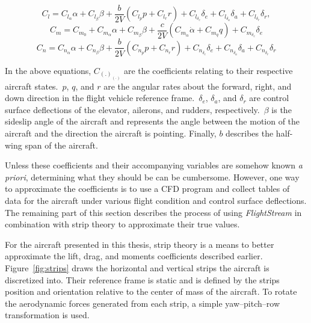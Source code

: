 \begin{equation}\label{eq:rollingmomentcoefficient}
    C_l = C_{l_\alpha}\alpha + C_{l_\beta}\beta + \frac{b}{2V}\left(C_{l_p}p + C_{l_r}r\right) + C_{l_{\delta_e}}\delta_e + C_{l_{\delta_a}}\delta_a + C_{l_{\delta_r}}\delta_r,
\end{equation}
\begin{equation}\label{eq:pitchingmomentcoefficient}
    C_m = C_{m_0} + C_{m_\alpha}\alpha + C_{m_\beta}\beta + \frac{c}{2V}\left(C_{m_{\dot{\alpha}}}\dot{\alpha} + C_{m_q}q\right) + C_{m_{\delta_e}}\delta_e
\end{equation}
\begin{equation}\label{eq:yawingmomentcoefficient}
    C_n = C_{n_\alpha}\alpha + C_{n_\beta}\beta + \frac{b}{2V}\left(C_{n_{p}}p + C_{n_r}r\right) + C_{n_{\delta_e}}\delta_e + C_{n_{\delta_a}}\delta_a + C_{n_{\delta_r}}\delta_r
\end{equation}

In the above equations, \(C_{{(.)}_{(.)}}\) are the coefficients relating to their respective aircraft states.~\(p\), \(q\), and \(r\) are the angular rates about the forward, right, and down direction in the flight vehicle reference frame.~\(\delta_e\), \(\delta_a\), and \(\delta_r\) are control surface deflections of the elevator, ailerons, and rudders, respectively.~\( \beta \) is the sideslip angle of the aircraft and represents the angle between the motion of the aircraft and the direction the aircraft is pointing. Finally, \(b\) describes the half-wing span of the aircraft.

Unless these coefficients and their accompanying variables are somehow known \textit{a priori}, determining what they should be can be cumbersome. However, one way to approximate the coefficients is to use a CFD program and collect tables of data for the aircraft under various flight condition and control surface deflections. The remaining part of this section describes the process of using \textit{FlightStream} in combination with strip theory to approximate their true values.

For the aircraft presented in this thesis, strip theory is a means to better approximate the lift, drag, and moments coefficients described earlier. Figure~\ref{fig:strips} draws the horizontal and vertical strips the aircraft is discretized into. Their reference frame is static and is defined by the strips position and orientation relative to the center of mass of the aircraft. To rotate the aerodynamic forces generated from each strip, a simple yaw{--}pitch{--}row transformation is used.

